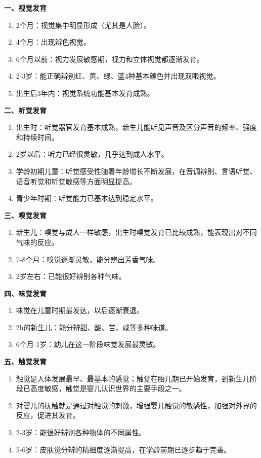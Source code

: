 \begin{keybox}
\textbf{一、视觉发育}

\begin{enumerate}[leftmargin=*]
    \item 2个月：视觉集中明显形成（尤其是人脸）。
    \item 4个月：出现辨色视觉。
    \item 6个月以前：视力发展敏感期，视力和立体视觉都逐渐发育。
    \item 2-3岁：能正确辨别红、黄、绿、蓝4种基本颜色并出现双眼视觉。
    \item 出生后3年内：视觉系统功能基本发育成熟。
\end{enumerate}

\textbf{二、听觉发育}

\begin{enumerate}[leftmargin=*]
    \item 出生时：听觉器官发育基本成熟，新生儿能听见声音及区分声音的频率、强度和持续时间。
    \item 2岁以后：听力已经很灵敏，几乎达到成人水平。
    \item 学龄初期儿童：听觉感受性随着年龄增长不断发展，在音调辨别、言语听觉、语音听觉和听觉敏感等方面明显提高。
    \item 青少年时期：听觉能力已基本达到稳定水平。
\end{enumerate}

\textbf{三、嗅觉发育}

\begin{enumerate}[leftmargin=*]
    \item 新生儿：嗅觉与成人一样敏感，出生时嗅觉发育已比较成熟，能表现出对不同气味的反应。
    \item 7-8个月：嗅觉逐渐灵敏，能分辨出芳香气味。
    \item 2岁左右：已能很好辨别各种气味。
\end{enumerate}

\textbf{四、味觉发育}

\begin{enumerate}[leftmargin=*]
    \item 味觉在儿童时期最发达，以后逐渐衰退。
    \item 2h的新生儿：能分辨甜、酸、苦、咸等多种味道。
    \item 6个月-1岁：幼儿在这一阶段味觉发展最灵敏。
\end{enumerate}

\textbf{五、触觉发育}

\begin{enumerate}[leftmargin=*]
    \item 触觉是人体发展最早、最基本的感觉；触觉在胎儿期已开始发育，到新生儿阶段已高度敏感，触觉是婴儿认识世界的主要手段之一。
    \item 对婴儿的抚触就是通过对触觉的刺激，增强婴儿触觉的敏感性，加强对外界的反应，促进其发育。
    \item 2-3岁：能很好辨别各种物体的不同属性。
    \item 5-6岁：皮肤觉分辨的精细度逐渐提高，在学龄前期已逐步趋于完善。
\end{enumerate}


\end{keybox}
